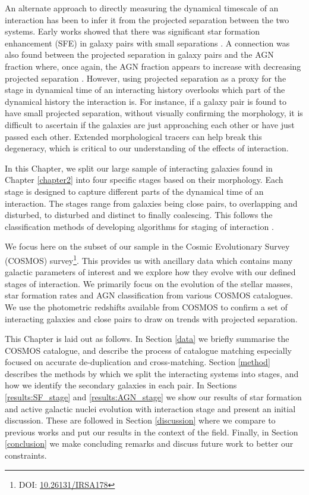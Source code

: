 An alternate approach to directly measuring the dynamical timescale of an interaction has been to infer it from the projected separation between the two systems. Early works showed that there was significant star formation enhancement (SFE) in galaxy pairs with small separations \citep{2003MNRAS.346.1189L,2008MNRAS.385.1903L, 2008AJ....135.1877E, 2022ApJ...940....4S}. A connection was also found between the projected separation in galaxy pairs and the AGN fraction where, once again, the AGN fraction appears to increase with decreasing projected separation \citep{2009MNRAS.399.2172R, 2011MNRAS.418.2043E, 2017MNRAS.465.2671G, 2021ApJ...909..124S}. However, using projected separation as a proxy for the stage in dynamical time of an interacting history overlooks which part of the dynamical history the interaction is. For instance, if a galaxy pair is found to have small projected separation, without visually confirming the morphology, it is difficult to ascertain if the galaxies are just approaching each other or have just passed each other. Extended morphological tracers can help break this degeneracy, which is critical to our understanding of the effects of interaction.

In this Chapter, we split our large sample of interacting galaxies found in Chapter \ref{chapter2} into four specific stages based on their morphology. Each stage is designed to capture different parts of the dynamical time of an interaction. The stages range from galaxies being close pairs, to overlapping and disturbed, to disturbed and distinct to finally coalescing. This follows the classification methods of developing algorithms for staging of interaction \citep{2019MNRAS.490.5390B,2022ApJ...937...97C}. 

We focus here on the subset of our sample in the Cosmic Evolutionary Survey (COSMOS) survey\footnote{DOI: \href{https://www.ipac.caltech.edu/doi/irsa/10.26131/IRSA178}{10.26131/IRSA178}}. This provides us with ancillary data which contains many galactic parameters of interest and we explore how they evolve with our defined stages of interaction. We primarily focus on the evolution of the stellar masses, star formation rates and AGN classification from various COSMOS catalogues. We use the photometric redshifts available from COSMOS to confirm a set of interacting galaxies and close pairs to draw on trends with projected separation.

This Chapter is laid out as follows. In Section \ref{data} we briefly summarise the COSMOS catalogue, and describe the process of catalogue matching especially focused on accurate de-duplication and cross-matching. Section \ref{method} describes the methods by which we split the interacting systems into stages, and how we identify the secondary galaxies in each pair. In Sections \ref{results:SF_stage} and \ref{results:AGN_stage} we show our results of star formation and active galactic nuclei evolution with interaction stage and present an initial discussion. These are followed in Section \ref{discussion} where we compare to previous works and put our results in the context of the field. Finally, in Section \ref{conclusion} we make concluding remarks and discuss future work to better our constraints. 

